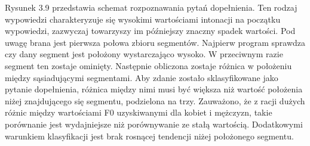 \documentclass[a4paper,12 pt]{report}
\begin{document}
\FloatBarrier
Rysunek 3.9 przedstawia schemat rozpoznawania pytań dopełnienia. Ten rodzaj wypowiedzi charakteryzuje się wysokimi wartościami intonacji na początku wypowiedzi, zazwyczaj towarzyszy im późniejszy znaczny spadek wartości.
Pod uwagę brana jest pierwsza połowa zbioru segmentów. Najpierw program sprawdza czy dany segment jest położony wystarczająco wysoko. W przeciwnym razie segment ten zostaje ominięty. Następnie obliczona zostaje różnica w położeniu między sąsiadującymi segmentami.
Aby zdanie zostało sklasyfikowane jako pytanie dopełnienia, różnica między nimi musi być większa niż wartość położenia niżej znajdującego się segmentu, podzielona na trzy. Zauważono, że z racji dużych różnic między wartościami F0 uzyskiwanymi dla kobiet i mężczyzn, takie porównanie jest wydajniejsze niż porównywanie ze stałą wartością. Dodatkowymi warunkiem klasyfikacji jest brak rosnącej tendencji niżej położonego segmentu.
\end{document}
